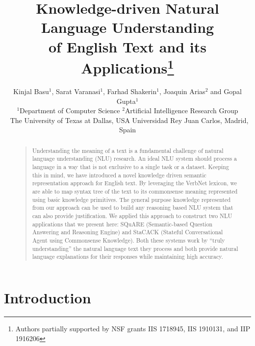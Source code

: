 \documentclass[letterpaper]{article}
\begin{document}
\title{Knowledge-driven Natural Language Understanding\\of English Text and its Applications\thanks{Authors partially supported by NSF grants IIS 1718945, IIS 1910131, and IIP 1916206}}

\author {
  Kinjal Basu$^1$, Sarat  Varanasi$^1$, Farhad Shakerin$^1$, Joaquin Arias$^2$ and Gopal Gupta$^1$\\[.5em]
  {  \large $^1$Department of Computer Science \hfill $^2$Artificial Intelligence Research Group}\\{\large ~\hspace{.3em}The University of Texas at Dallas, USA\hspace{.7em} \hfill Universidad Rey Juan Carlos, Madrid, Spain}
}



\maketitle
\begin{abstract}
\begin{quote}
Understanding the meaning of a text is a fundamental challenge of natural language understanding (NLU) research. An ideal NLU system should process a language in a way that is not exclusive to a single task or a dataset. Keeping this in mind, we have introduced a novel knowledge driven semantic representation approach for English text. By leveraging the VerbNet lexicon, we are able to map syntax tree of the text to its commonsense meaning represented using basic knowledge primitives. The general purpose knowledge represented from our approach can be used to build any reasoning based NLU system that can also provide justification. We applied this approach to construct two NLU applications that we present here: SQuARE (Semantic-based Question Answering and Reasoning Engine) and StaCACK (Stateful Conversational Agent using Commonsense Knowledge).
Both these systems work by ``truly understanding'' the natural language text they process and both provide natural language explanations for their responses while maintaining high accuracy.

\end{quote}
\end{abstract}

\section{Introduction}
\end{document}
